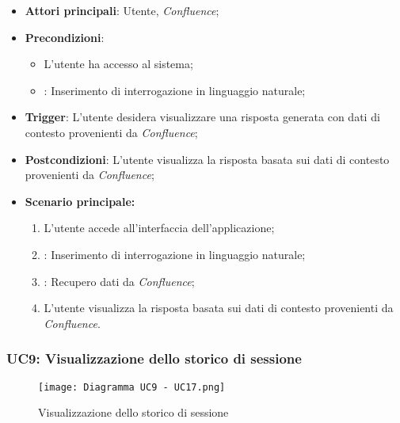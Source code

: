 \hypertarget{UC8.3}{}
\begin{itemize}
    \item \textbf{Attori principali}: Utente, \emph{Confluence};
    \item \textbf{Precondizioni}: 
    \begin{itemize}
        \item L'utente ha accesso al sistema;
        \item {}: Inserimento di interrogazione in linguaggio naturale;
    \end{itemize}
    \item \textbf{Trigger}: L'utente desidera visualizzare una risposta generata con dati di contesto provenienti da \emph{Confluence};
    \item \textbf{Postcondizioni}: L'utente visualizza la risposta basata sui dati di contesto provenienti da \emph{Confluence};
    \item \textbf{Scenario principale:}
    \begin{enumerate}
        \item L'utente accede all'interfaccia dell'applicazione;
        \item {}: Inserimento di interrogazione in linguaggio naturale;
        \item {}: Recupero dati da \emph{Confluence};
        \item L'utente visualizza la risposta basata sui dati di contesto provenienti da \emph{Confluence}.
    \end{enumerate}
\end{itemize}


\newpage
\hypertarget{UC9}{}
\subsubsection{UC9: Visualizzazione dello storico di sessione}

\begin{figure}[h]
    \centering
    \texttt{[image: Diagramma UC9 - UC17.png]}
    \caption{Visualizzazione dello storico di sessione}
\end{figure}

